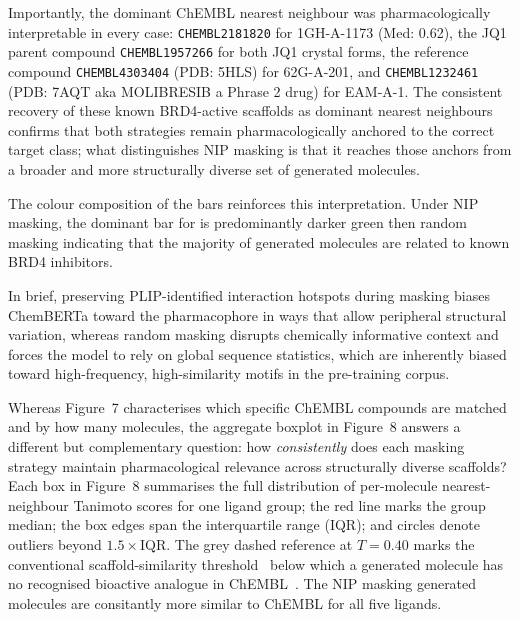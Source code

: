 \documentclass[a4paper,12pt]{article}
\begin{document}
Importantly, the dominant ChEMBL nearest neighbour was pharmacologically
interpretable in every case: \texttt{CHEMBL2181820} for 1GH-A-1173 (Med: 0.62),
the JQ1 parent compound \texttt{CHEMBL1957266} for both JQ1 crystal forms, the
reference compound \texttt{CHEMBL4303404} (PDB: 5HLS) for 62G-A-201, and
\texttt{CHEMBL1232461} (PDB: 7AQT aka MOLIBRESIB a Phrase 2 drug) for EAM-A-1.
The consistent recovery of these known BRD4-active scaffolds as dominant
nearest neighbours confirms that both strategies remain pharmacologically
anchored to the correct target class; what distinguishes NIP masking is
that it reaches those anchors from a broader and more structurally
diverse set of generated molecules.
 
The colour composition of the bars reinforces this interpretation.
Under NIP masking, the dominant bar for  is predominantly
darker green then random masking  indicating that the majority of
generated molecules are related to known BRD4 inhibitors.


In brief, preserving PLIP-identified interaction hotspots
during masking biases ChemBERTa toward the pharmacophore in ways that
allow peripheral structural variation, whereas random masking disrupts
chemically informative context and forces the model to rely on global
sequence statistics, which are inherently biased toward high-frequency,
high-similarity motifs in the pre-training corpus.
 

 
Whereas Figure~7 characterises which specific ChEMBL compounds are
matched and by how many molecules, the aggregate boxplot in Figure~8
answers a different but complementary question: how \emph{consistently}
does each masking strategy maintain pharmacological relevance across
structurally diverse scaffolds?
Each box in Figure~8 summarises the full distribution of
per-molecule nearest-neighbour Tanimoto scores for one ligand group;
the red line marks the group median; the box edges span the
interquartile range (IQR); and circles denote outliers beyond
$1.5 \times \text{IQR}$.
The grey dashed reference at $T = 0.40$ marks the conventional
scaffold-similarity threshold~\cite{maggiora2014} below which a generated molecule
has no recognised bioactive analogue in ChEMBL~\cite{gaulton2012chembl}.
The NIP masking generated molecules are consitantly more similar to ChEMBL for all five ligands. 
\end{document}
